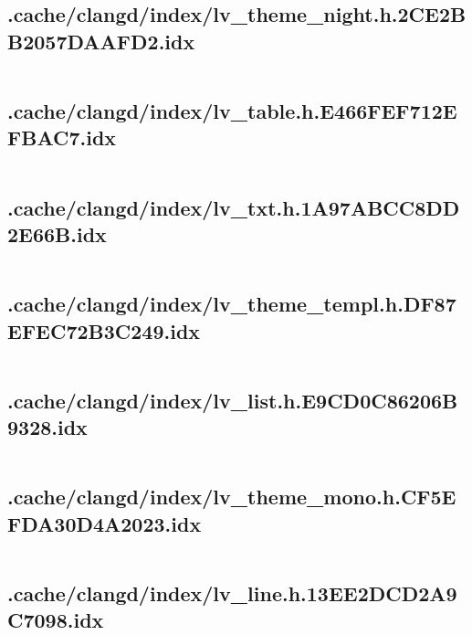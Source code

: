 \subsection{.cache/clangd/index/lv_theme_night.h.2CE2BB2057DAAFD2.idx}
\inputminted[linenos,tabsize=2,breaklines, breakanywhere]{c}{lv_theme_night.h.2CE2BB2057DAAFD2.idx}
\pagebreak

\subsection{.cache/clangd/index/lv_table.h.E466FEF712EFBAC7.idx}
\inputminted[linenos,tabsize=2,breaklines, breakanywhere]{c}{lv_table.h.E466FEF712EFBAC7.idx}
\pagebreak

\subsection{.cache/clangd/index/lv_txt.h.1A97ABCC8DD2E66B.idx}
\inputminted[linenos,tabsize=2,breaklines, breakanywhere]{c}{lv_txt.h.1A97ABCC8DD2E66B.idx}
\pagebreak

\subsection{.cache/clangd/index/lv_theme_templ.h.DF87EFEC72B3C249.idx}
\inputminted[linenos,tabsize=2,breaklines, breakanywhere]{c}{lv_theme_templ.h.DF87EFEC72B3C249.idx}
\pagebreak

\subsection{.cache/clangd/index/lv_list.h.E9CD0C86206B9328.idx}
\inputminted[linenos,tabsize=2,breaklines, breakanywhere]{c}{lv_list.h.E9CD0C86206B9328.idx}
\pagebreak

\subsection{.cache/clangd/index/lv_theme_mono.h.CF5EFDA30D4A2023.idx}
\inputminted[linenos,tabsize=2,breaklines, breakanywhere]{c}{lv_theme_mono.h.CF5EFDA30D4A2023.idx}
\pagebreak

\subsection{.cache/clangd/index/lv_line.h.13EE2DCD2A9C7098.idx}
\inputminted[linenos,tabsize=2,breaklines, breakanywhere]{c}{lv_line.h.13EE2DCD2A9C7098.idx}
\pagebreak

